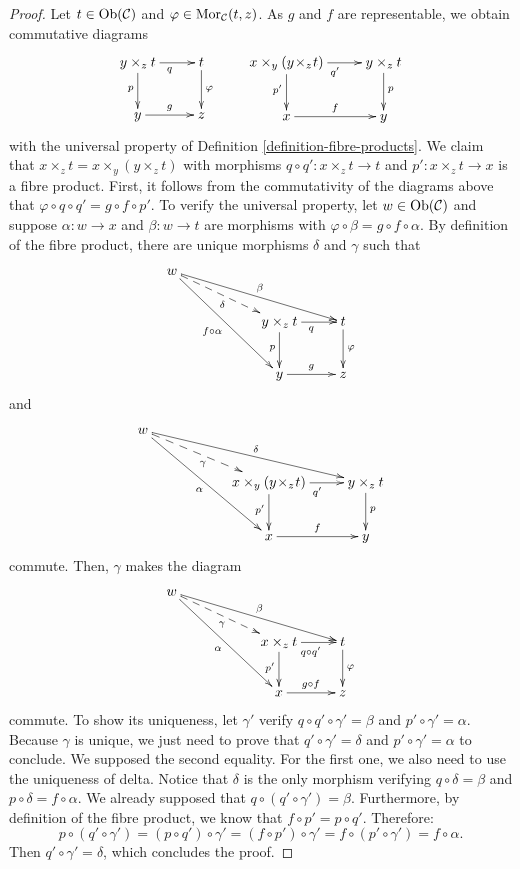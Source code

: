\begin{proof}
Let $t \in \mathop{\mathrm{Ob}}\nolimits(\mathcal C)$ and $ \varphi \in \mathop{\mathrm{Mor}}\nolimits_{\mathcal C}(t,z) $.
As $g$ and $f$ are representable, we obtain commutative diagrams
$$
\xymatrix{
y \times_z t \ar[r]_q \ar[d]_p &
t \ar[d]^{\varphi} \\
y \ar[r]^{g} & z
}
\quad\quad
\xymatrix{
x \times_y (y\! \times_z\! t) \ar[r]_{q'} \ar[d]_{p'} &
y \times_z t \ar[d]^p \\
x \ar[r]^f & y
}
$$
with the universal property of Definition \ref{definition-fibre-products}.
We claim that $x \times_z t = x \times_y (y \times_z t)$
with morphisms $q \circ q' : x \times_z t \to t$ and $p' : x \times_z t \to x$
is a fibre product. First, it follows from the commutativity of the
diagrams above that $\varphi \circ q \circ q' = g \circ f \circ p'$.
To verify the universal property, let
$w \in \mathop{\mathrm{Ob}}\nolimits(\mathcal C)$ and suppose $\alpha : w \to x$ and
$\beta : w \to t$ are morphisms with
$\varphi \circ \beta = g \circ f \circ \alpha$.
By definition of the fibre product, there
are unique morphisms $\delta$ and $\gamma$ such that
$$
\xymatrix{
w \ar[rrrd]^\beta \ar@{-->}[rrd]_\delta \ar[rrdd]_{f\circ\alpha} & & \\
& & y \times_z t \ar[d]_p \ar[r]_q & t \ar[d]^{\varphi} \\
& & y \ar[r]^{g} & z
}
$$
and
$$
\xymatrix{
w \ar[rrrd]^\delta \ar@{-->}[rrd]_\gamma \ar[rrdd]_{\alpha} & & \\
& & x \times_y (y\!\times_z\! t) \ar[d]_{p'} \ar[r]_{q'} &
y \times_z t \ar[d]^{p} \\
& & x \ar[r]^{f} & y
}
$$
commute. Then, $\gamma$ makes the diagram
$$
\xymatrix{
w \ar[rrrd]^\beta \ar@{-->}[rrd]_\gamma \ar[rrdd]_{\alpha} & & \\
& & x \times_z t \ar[d]_{p'} \ar[r]_{q\circ q'} & t \ar[d]^{\varphi} \\
& & x \ar[r]^{g\circ f} & z
}
$$
commute. To show its uniqueness, let $\gamma'$ verify $ q\circ q'\circ\gamma' =
\beta $ and $ p'\circ \gamma' = \alpha $. Because $\gamma$ is unique, we just
need to prove that $ q'\circ\gamma' = \delta $ and $ p'\circ\gamma' = \alpha $
to conclude. We supposed the second equality. For the first one, we also need
to use the uniqueness of delta. Notice that $\delta$ is the only morphism
verifying $ q\circ\delta = \beta $ and $ p\circ\delta = f\circ\alpha $. We
already supposed that $ q\circ (q'\circ\gamma') = \beta $. Furthermore, by
definition of the fibre product, we know that $ f\circ p' = p\circ q' $.
Therefore:
$$
p\circ (q'\circ\gamma') =
(p\circ q')\circ\gamma' =
(f\circ p')\circ\gamma' =
f\circ (p'\circ\gamma') = f\circ\alpha.
$$
Then $ q'\circ\gamma' = \delta $, which concludes the proof.
\end{proof}

